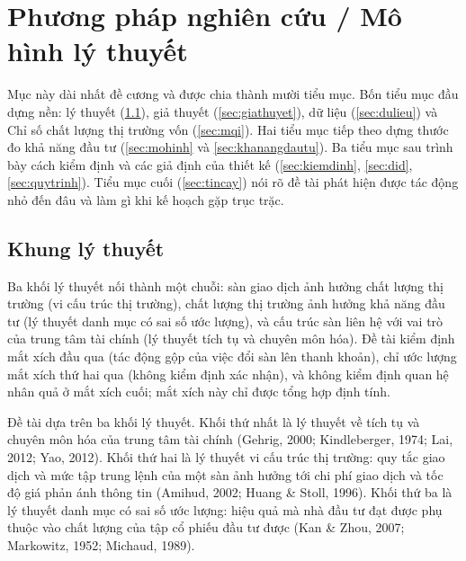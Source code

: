 \section{Phương pháp nghiên cứu / Mô hình lý thuyết}\label{sec:phuongphap}

Mục này dài nhất đề cương và được chia thành mười tiểu mục. Bốn tiểu mục đầu dựng nền: lý thuyết (\ref{sec:khung}), giả thuyết (\ref{sec:giathuyet}), dữ liệu (\ref{sec:dulieu}) và Chỉ số chất lượng thị trường vốn (\ref{sec:mqi}). Hai tiểu mục tiếp theo dựng thước đo khả năng đầu tư (\ref{sec:mohinh} và \ref{sec:khanangdautu}). Ba tiểu mục sau trình bày cách kiểm định và các giả định của thiết kế (\ref{sec:kiemdinh}, \ref{sec:did}, \ref{sec:quytrinh}). Tiểu mục cuối (\ref{sec:tincay}) nói rõ đề tài phát hiện được tác động nhỏ đến đâu và làm gì khi kế hoạch gặp trục trặc.

\subsection{Khung lý thuyết}\label{sec:khung}

\begin{tomtat}
Ba khối lý thuyết nối thành một chuỗi: sàn giao dịch ảnh hưởng chất lượng thị trường (vi cấu trúc thị trường), chất lượng thị trường ảnh hưởng khả năng đầu tư (lý thuyết danh mục có sai số ước lượng), và cấu trúc sàn liên hệ với vai trò của trung tâm tài chính (lý thuyết tích tụ và chuyên môn hóa). Đề tài kiểm định mắt xích đầu qua  (tác động gộp của việc đổi sàn lên thanh khoản), chỉ ước lượng mắt xích thứ hai qua  (không kiểm định xác nhận), và không kiểm định quan hệ nhân quả ở mắt xích cuối; mắt xích này chỉ được tổng hợp định tính.
\end{tomtat}

Đề tài dựa trên ba khối lý thuyết. Khối thứ nhất là lý thuyết về tích tụ và chuyên môn hóa của trung tâm tài chính (Gehrig, 2000; Kindleberger, 1974; Lai, 2012; Yao, 2012). Khối thứ hai là lý thuyết vi cấu trúc thị trường: quy tắc giao dịch và mức tập trung lệnh của một sàn ảnh hưởng tới chi phí giao dịch và tốc độ giá phản ánh thông tin (Amihud, 2002; Huang \& Stoll, 1996). Khối thứ ba là lý thuyết danh mục có sai số ước lượng: hiệu quả mà nhà đầu tư đạt được phụ thuộc vào chất lượng của tập cổ phiếu đầu tư được (Kan \& Zhou, 2007; Markowitz, 1952; Michaud, 1989).

